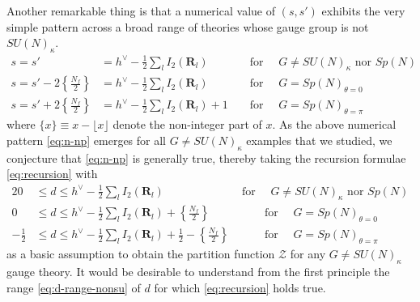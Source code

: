 \documentclass[letterpaper, 11pt]{article}
\newcommand{\nn}{\nonumber}
\def\k{\kappa}
\begin{document}
{%


Another remarkable thing is that a numerical value of  $(s, s')$ exhibits the very simple pattern across a broad range of theories whose gauge group is not $SU(N)_\k$. %
\begin{align}
  \label{eq:n-np}
 s = s' &= h^\vee - \frac{1}{2} \sum_{l}I_2(\mathbf{R}_l)  && \text{ for } \quad   G\neq SU(N)_\kappa \text{ nor } Sp(N) \nn \\
 s = s' - 2\left\{\frac{N_f}{2} \right\} &= h^\vee - \frac{1}{2} \sum_{l}I_2(\mathbf{R}_l)
 &&   \text{ for }  \quad G = Sp(N)_{\theta=0}\\
 s = s' + 2 \left\{\frac{N_f}{2} \right\} &= h^\vee - \frac{1}{2} \sum_{l}I_2(\mathbf{R}_l) + 1 &&   \text{ for }  \quad G = Sp(N)_{\theta=\pi} \nn
\end{align}
where $\{ x\} \equiv x - \lfloor x \rfloor $ denote the non-integer part of $x$.
As the above numerical pattern \eqref{eq:n-np} emerges for all $G \neq SU(N)_\k$ examples that we studied, we conjecture that \eqref{eq:n-np} is generally true, thereby taking the recursion formulae \eqref{eq:recursion} with
\begin{alignat}{2}
 \label{eq:d-range-nonsu}
  0 & \leq d \leq h^\vee - \frac{1}{2} \sum_{l}I_2(\mathbf{R}_l)  & \text{ for } \quad G \neq SU(N)_\kappa \text{ nor } Sp(N)  \nn \\
  0 &\leq  d \leq h^\vee - \frac{1}{2} \sum_{l}I_2(\mathbf{R}_l) + \left\{\frac{N_f}{2} \right\} & \qquad \text{ for }\quad G =Sp(N)_{\theta=0} \\
  -\frac{1}{2} &\leq  d \leq h^\vee - \frac{1}{2} \sum_{l}I_2(\mathbf{R}_l) + \frac{1}{2} - \left\{\frac{N_f}{2} \right\} & \qquad \text{ for }\quad G =Sp(N)_{\theta=\pi} \nn
\end{alignat}
as a basic assumption to obtain the partition function $\mathcal{Z}$ for any $G \neq SU(N)_\k$ gauge theory. 
It would be desirable to understand from the first principle the range  \eqref{eq:d-range-nonsu} of $d$ for which \eqref{eq:recursion} holds true.

}
\end{document}
